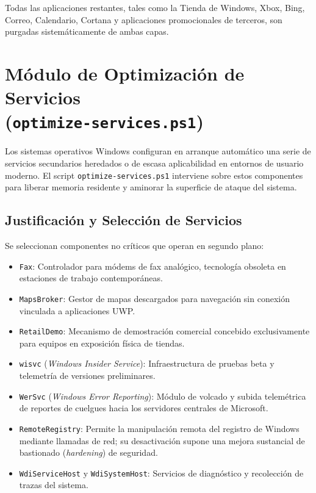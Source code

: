 \documentclass[12pt,a4paper]{report}
\begin{document}
Todas las aplicaciones restantes, tales como la Tienda de Windows, Xbox, Bing, Correo, Calendario, Cortana y aplicaciones promocionales de terceros, son purgadas sistemáticamente de ambas capas.

\section[Módulo de Optimización de Servicios]{Módulo de Optimización de Servicios\\ \large(\texttt{optimize-services.ps1})}
Los sistemas operativos Windows configuran en arranque automático una serie de servicios secundarios heredados o de escasa aplicabilidad en entornos de usuario moderno. El script \texttt{optimize-services.ps1} interviene sobre estos componentes para liberar memoria residente y aminorar la superficie de ataque del sistema.

\subsection{Justificación y Selección de Servicios}
Se seleccionan componentes no críticos que operan en segundo plano:
\begin{itemize}
    \item \texttt{Fax}: Controlador para módems de fax analógico, tecnología obsoleta en estaciones de trabajo contemporáneas.
    \item \texttt{MapsBroker}: Gestor de mapas descargados para navegación sin conexión vinculada a aplicaciones UWP.
    \item \texttt{RetailDemo}: Mecanismo de demostración comercial concebido exclusivamente para equipos en exposición física de tiendas.
    \item \texttt{wisvc} (\textit{Windows Insider Service}): Infraestructura de pruebas beta y telemetría de versiones preliminares.
    \item \texttt{WerSvc} (\textit{Windows Error Reporting}): Módulo de volcado y subida telemétrica de reportes de cuelgues hacia los servidores centrales de Microsoft.
    \item \texttt{RemoteRegistry}: Permite la manipulación remota del registro de Windows mediante llamadas de red; su desactivación supone una mejora sustancial de bastionado (\textit{hardening}) de seguridad.
    \item \texttt{WdiServiceHost} y \texttt{WdiSystemHost}: Servicios de diagnóstico y recolección de trazas del sistema.
\end{itemize}
\end{document}
